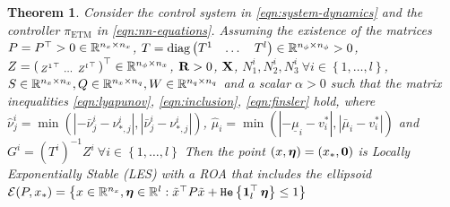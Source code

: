 \documentclass{ifacconf}
\theoremstyle{plain}
\newtheorem{theorem}{Theorem}
\begin{document}
\begin{theorem}\label{thm:stability} \emph{ Consider the control system in \eqref{eqn:system-dynamics} and the controller $\pi_{\text{ETM}}$ in \eqref{eqn:nn-equations}. Assuming the existence of the matrices $P = P^\top > 0 \in {\mathbb{R}}^{n_x \times n_x}$,} $T = \text{diag} \left(\begin{matrix}T^1 & \dots & T^l\end{matrix}\right) \in {\mathbb{R}}^{n_{\phi} \times n_{\phi}} > 0$, \emph{$Z = \left(\begin{smallmatrix} {Z^1}^\top & \dots & {Z^l}^\top \end{smallmatrix} \right)^\top \in {\mathbb{R}}^{n_{\phi} \times n_x}$, ${\bf{R}} > 0$, ${\bf{X}}$, $N^i_1, N^i_2, N^i_3 \ \forall i \in \left\{ 1, \dots, l \right\}$, $S \in {\mathbb{R}}^{n_x \times n_x}, Q \in {\mathbb{R}}^{n_x \times n_q}, W \in {\mathbb{R}}^{n_q \times n_q}$ and a scalar $\alpha > 0$ such that the matrix inequalities \eqref{eqn:lyapunov}, \eqref{eqn:inclusion}, \eqref{eqn:finsler} hold, where $\hat{\nu}_j^i = \min(|-\bar{\nu}_j^i - \nu^i_{*, j}|,|\bar{\nu}_j^i - \nu^i_{*, j}|)$, $
\hat{\mu}_i = \min(|-\underline{\mu}_i - v_i^*|,|\bar{\mu}_i - v_i^*|)$ and $G^i = (T^i)^{-1} Z^i\ \forall i \in \left\{1, \dots, l \right\}$
Then the point $(x, \boldsymbol{\eta}) = (x_*, \operatorname{\mathbf{0}})$ is Locally Exponentially Stable (LES) with a ROA that includes the ellipsoid ${\mathcal{E}}(P, x_*) = \left\{ x \in {\mathbb{R}}^{n_x}, \boldsymbol{\eta} \in {\mathbb{R}}^{l} : \tilde{x}^\top P \tilde{x} + \texttt{\relax{He}}\left\{{\operatorname{\mathbf{1}}_l^\top \boldsymbol{\eta}}\right\} \leq 1\right\}$}
\end{theorem}
\end{document}
